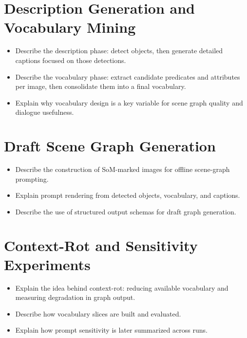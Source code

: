 \documentclass[
  digital,     %
  oneside,     %
  nosansbold,  %
  nocolorbold, %
  lof,         %
  lot,         %
]{fithesis4}
\begin{document}
\section{Description Generation and Vocabulary Mining}
\begin{itemize}
    \item Describe the description phase: detect objects, then generate detailed captions focused on those detections.
    \item Describe the vocabulary phase: extract candidate predicates and attributes per image, then consolidate them into a final vocabulary.
    \item Explain why vocabulary design is a key variable for scene graph quality and dialogue usefulness.
\end{itemize}

\section{Draft Scene Graph Generation}
\begin{itemize}
    \item Describe the construction of SoM-marked images for offline scene-graph prompting.
    \item Explain prompt rendering from detected objects, vocabulary, and captions.
    \item Describe the use of structured output schemas for draft graph generation.
\end{itemize}

\section{Context-Rot and Sensitivity Experiments}
\begin{itemize}
    \item Explain the idea behind context-rot: reducing available vocabulary and measuring degradation in graph output.
    \item Describe how vocabulary slices are built and evaluated.
    \item Explain how prompt sensitivity is later summarized across runs.
\end{itemize}
\end{document}
